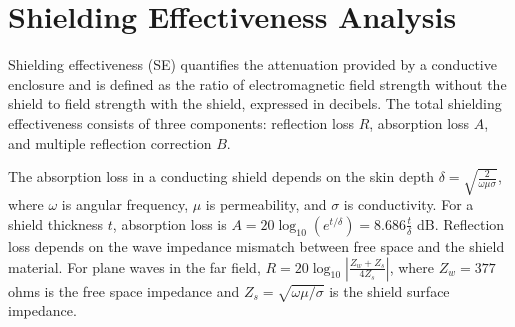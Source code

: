 \documentclass[11pt,a4paper]{article}
\begin{document}
\section{Shielding Effectiveness Analysis}

Shielding effectiveness (SE) quantifies the attenuation provided by a conductive enclosure and is defined as the ratio of electromagnetic field strength without the shield to field strength with the shield, expressed in decibels. The total shielding effectiveness consists of three components: reflection loss $R$, absorption loss $A$, and multiple reflection correction $B$.

The absorption loss in a conducting shield depends on the skin depth $\delta = \sqrt{\frac{2}{\omega \mu \sigma}}$, where $\omega$ is angular frequency, $\mu$ is permeability, and $\sigma$ is conductivity. For a shield thickness $t$, absorption loss is $A = 20 \log_{10}(e^{t/\delta}) = 8.686 \frac{t}{\delta}$ dB. Reflection loss depends on the wave impedance mismatch between free space and the shield material. For plane waves in the far field, $R = 20 \log_{10}\left|\frac{Z_w + Z_s}{4Z_s}\right|$, where $Z_w = 377$ ohms is the free space impedance and $Z_s = \sqrt{\omega \mu / \sigma}$ is the shield surface impedance.
\end{document}
